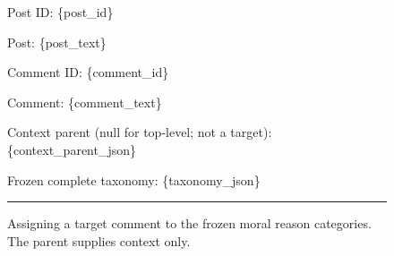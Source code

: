 \begin{figure}[H]
\begin{minipage}{0.97\textwidth}
Post ID: \{post\_id\}

Post: \{post\_text\}

Comment ID: \{comment\_id\}

Comment: \{comment\_text\}

Context parent (null for top-level; not a target): \{context\_parent\_json\}

Frozen complete taxonomy: \{taxonomy\_json\}

\vspace{0.6em}
\hrule
\end{minipage}
\caption{Assigning a target comment to the frozen moral reason categories. The parent supplies context only.}
\label{fig:moral-reason-classify-prompt}
\end{figure}
